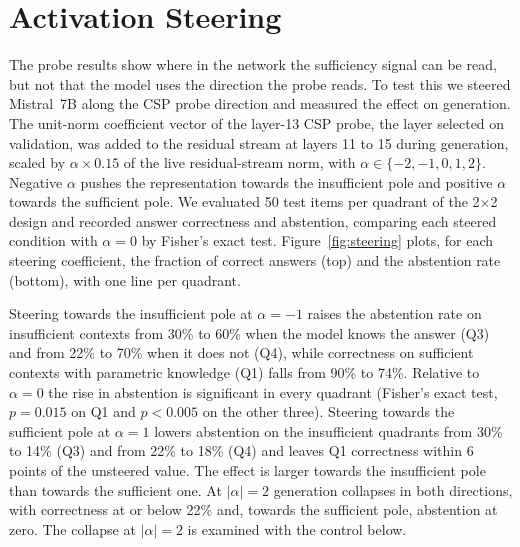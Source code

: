 \documentclass[acmsmall,screen,review]{acmart}
\begin{document}
\section{Activation Steering}
\label{sec:steering_app}
The probe results show where in the network the sufficiency signal can be read, but not that the model uses the direction the probe reads. To test this we steered Mistral~7B along the CSP probe direction and measured the effect on generation. The unit-norm coefficient vector of the layer-13 CSP probe, the layer selected on validation, was added to the residual stream at layers 11 to 15 during generation, scaled by $\alpha \times 0.15$ of the live residual-stream norm, with $\alpha \in \{-2, -1, 0, 1, 2\}$. Negative $\alpha$ pushes the representation towards the insufficient pole and positive $\alpha$ towards the sufficient pole. We evaluated 50 test items per quadrant of the 2$\times$2 design and recorded answer correctness and abstention, comparing each steered condition with $\alpha = 0$ by Fisher's exact test. Figure~\ref{fig:steering} plots, for each steering coefficient, the fraction of correct answers (top) and the abstention rate (bottom), with one line per quadrant.

Steering towards the insufficient pole at $\alpha = -1$ raises the abstention rate on insufficient contexts from 30\% to 60\% when the model knows the answer (Q3) and from 22\% to 70\% when it does not (Q4), while correctness on sufficient contexts with parametric knowledge (Q1) falls from 90\% to 74\%. Relative to $\alpha = 0$ the rise in abstention is significant in every quadrant (Fisher's exact test, $p = 0.015$ on Q1 and $p < 0.005$ on the other three). Steering towards the sufficient pole at $\alpha = 1$ lowers abstention on the insufficient quadrants from 30\% to 14\% (Q3) and from 22\% to 18\% (Q4) and leaves Q1 correctness within 6 points of the unsteered value. The effect is larger towards the insufficient pole than towards the sufficient one. At $|\alpha| = 2$ generation collapses in both directions, with correctness at or below 22\% and, towards the sufficient pole, abstention at zero. The collapse at $|\alpha| = 2$ is examined with the control below.
\end{document}
